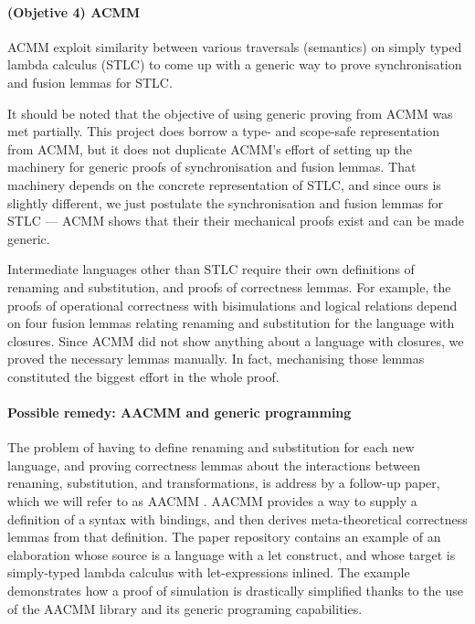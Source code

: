 \documentclass[bsc,frontabs,oneside,singlespacing,parskip,deptreport]{infthesis}
\theoremstyle{definition}
\theoremstyle{lemma}
\begin{document}
\paragraph{(Objetive 4) ACMM}
ACMM exploit similarity between various traversals (semantics) on
simply typed lambda calculus (STLC) to come up with a generic way to
prove synchronisation and fusion lemmas for STLC.

It should be noted that the objective of using generic proving from
ACMM was met partially. This project does borrow a type- and
scope-safe representation from ACMM, but it does not duplicate ACMM's
effort of setting up the machinery for generic proofs of
synchronisation and fusion lemmas. That machinery depends on the
concrete representation of STLC, and since ours is slightly different,
we just postulate the synchronisation and fusion lemmas for STLC ---
ACMM shows that their their mechanical proofs exist and can be made
generic.

Intermediate languages other than STLC require their own definitions
of renaming and substitution, and proofs of correctness lemmas. For
example, the proofs of operational correctness with bisimulations and
logical relations depend on four fusion lemmas relating renaming and
substitution for the language with closures. Since ACMM did not show
anything about a language with closures, we proved the necessary
lemmas manually. In fact, mechanising those lemmas constituted the
biggest effort in the whole proof.

\paragraph{Possible remedy: AACMM and generic programming}
The problem of having to define renaming and substitution for each new
language, and proving correctness lemmas about the interactions
between renaming, substitution, and transformations, is address by a
follow-up paper, which we will refer to as AACMM
\cite{DBLP:journals/pacmpl/AllaisA0MM18}. AACMM provides a way to
supply a definition of a syntax with bindings, and then derives
meta-theoretical correctness lemmas from that definition. The paper
repository contains an example of an elaboration whose source is a
language with a let construct, and whose target is simply-typed lambda
calculus with let-expressions inlined. The example demonstrates how a
proof of simulation is drastically simplified thanks to the use of the
AACMM library and its generic programing capabilities.
\end{document}

